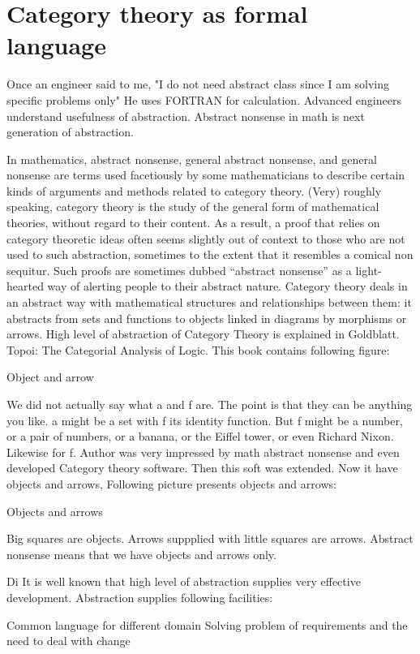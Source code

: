 \documentclass[10pt,journal,compsoc]{IEEEtran}
\begin{document}
	\section{Category theory as formal language}
	
	Once an engineer said to me, "I do not need abstract class since I am solving specific problems only" He uses FORTRAN for calculation. Advanced engineers understand usefulness of abstraction. Abstract nonsense in math is next generation of abstraction.
	
	In mathematics, abstract nonsense, general abstract nonsense, and general nonsense are terms used facetiously by some mathematicians to describe certain kinds of arguments and methods related to category theory. (Very) roughly speaking, category theory is the study of the general form of mathematical theories, without regard to their content. As a result, a proof that relies on category theoretic ideas often seems slightly out of context to those who are not used to such abstraction, sometimes to the extent that it resembles a comical non sequitur. Such proofs are sometimes dubbed “abstract nonsense” as a light-hearted way of alerting people to their abstract nature. Category theory deals in an abstract way with mathematical structures and relationships between them: it abstracts from sets and functions to objects linked in diagrams by morphisms or arrows. High level of abstraction of Category Theory is explained in Goldblatt. Topoi: The Categorial Analysis of Logic. This book contains following figure:
	
	Object and arrow
	
	We did not actually say what a and f are. The point is that they can be anything you like. a might be a set with f its identity function. But f might be a number, or a pair of numbers, or a banana, or the Eiffel tower, or even Richard Nixon. Likewise for f. Author was very impressed by math abstract nonsense and even developed Category theory software. Then this soft was extended. Now it have objects and arrows, Following picture presents objects and arrows:
	
	Objects and arrows
	
	Big squares are objects. Arrows suppplied with little squares are arrows. Abstract nonsense means that we have objects and arrows only.
	
	Di
	It is well known that high level of abstraction supplies very effective development. Abstraction supplies following facilities:
	
	Common language for different domain
	Solving problem of requirements and the need to deal with change
	
\end{document}
